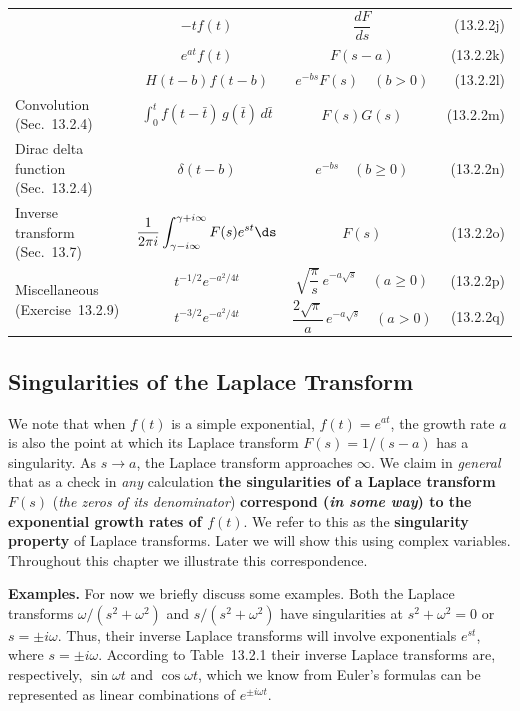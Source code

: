 \begin{table}[H]
\begin{tabular}{@{}lcc@{\qquad}r@{}}
 & $-t f(t)$ & $\dfrac{dF}{ds}$ & (13.2.2j) \\[6pt]
 & $e^{at}f(t)$ & $F(s-a)$ & (13.2.2k) \\[6pt]
 & $H(t-b)f(t-b)$ & $e^{-bs}F(s)\quad(b>0)$ & (13.2.2l) \\[6pt]
\midrule
Convolution (Sec.~13.2.4)
 & $\displaystyle\int_0^t f(t-\bar{t})\,g(\bar{t})\,d\bar{t}$ & $F(s)G(s)$ & (13.2.2m) \\[6pt]
\midrule
Dirac delta function (Sec.~13.2.4)
 & $\delta(t-b)$ & $e^{-bs}\quad(b\ge 0)$ & (13.2.2n) \\[6pt]
\midrule
Inverse transform (Sec.~13.7)
 & $\dfrac{1}{2\pi i}\displaystyle\int_{\gamma-i\infty}^{\gamma+i\infty} F(s)e^{st}\ds$
 & $F(s)$ & (13.2.2o) \\[6pt]
\midrule
\multirow{2}{*}{Miscellaneous (Exercise~13.2.9)}
 & $t^{-1/2}e^{-a^2/4t}$ & $\sqrt{\dfrac{\pi}{s}}\,e^{-a\sqrt{s}}\quad(a\ge 0)$ & (13.2.2p) \\[6pt]
 & $t^{-3/2}e^{-a^2/4t}$ & $\dfrac{2\sqrt{\pi}}{a}\,e^{-a\sqrt{s}}\quad(a > 0)$ & (13.2.2q) \\[6pt]
\bottomrule
\end{tabular}
\end{table}

\subsection{Singularities of the Laplace Transform}
\label{sec:13.2.2}

We note that when $f(t)$ is a simple exponential, $f(t) = e^{at}$, the growth rate $a$ is also the point at which its Laplace transform $F(s) = 1/(s-a)$ has a singularity.  As $s \to a$, the Laplace transform approaches $\infty$.  We claim in \emph{general} that as a check in \emph{any} calculation \textbf{the singularities of a Laplace transform $F(s)$} (\emph{the zeros of its denominator}) \textbf{correspond (\emph{in some way}) to the exponential growth rates of $f(t)$}.  We refer to this as the \textbf{singularity property} of Laplace transforms.  Later we will show this using complex variables.  Throughout this chapter we illustrate this correspondence.

\textbf{Examples.}
For now we briefly discuss some examples.  Both the Laplace transforms $\omega/(s^2+\omega^2)$ and $s/(s^2+\omega^2)$ have singularities at $s^2+\omega^2=0$ or $s = \pm i\omega$.  Thus, their inverse Laplace transforms will involve exponentials $e^{st}$, where $s = \pm i\omega$.  According to Table~13.2.1 their inverse Laplace transforms are, respectively, $\sin\omega t$ and $\cos\omega t$, which we know from Euler's formulas can be represented as linear combinations of $e^{\pm i\omega t}$.

